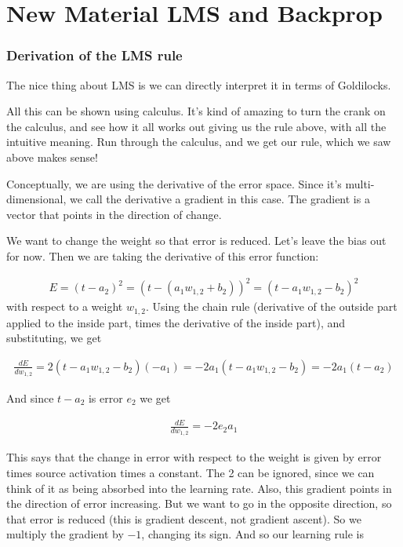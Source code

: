 \chapter{New Material LMS and Backprop}

\subsection{Derivation of the LMS rule}

The nice thing about LMS is we can directly interpret it in terms of Goldilocks.

All this can be shown using calculus. It's kind of amazing to turn the crank on the calculus, and see how it all works out giving us the rule above, with all the intuitive meaning. Run through the calculus, and we get our rule, which we saw above makes sense!

Conceptually, we are using the derivative of the error space. Since it's multi-dimensional, we call the derivative a gradient in this case. The gradient is a vector that points in the direction of change. 

We want to change the weight so that error is reduced. Let's leave the bias out for now. Then we are taking the  derivative of this error function:

\begin{eqnarray*}
E = (t - a_2)^2  =  (t - ( a_1 w_{1,2} + b_2))^2  =  (t -  a_1 w_{1,2} -  b_2)^2 
\end{eqnarray*}
with respect to a weight $w_{1,2}$.  Using the chain rule (derivative of the outside part applied to the inside part, times the derivative of the inside part), and substituting, we get

\begin{eqnarray*}
\frac{dE}{dw_{1,2}} = 2 (t - a_1 w_{1,2} - b_2) (-a_1) =  -2 a_1 (t - a_1 w_{1,2} - b_2) =  -2 a_1 (t - a_2)
\end{eqnarray*}

And since $t -  a_2$ is error $e_2$ we get

\begin{eqnarray*}
\frac{dE}{dw_{1,2}} = -2 e_2 a_1
\end{eqnarray*}

This says that the change in error with respect to the weight is given by error times source activation times a constant. The 2 can be ignored, since we can think of it as being absorbed into the learning rate. Also, this gradient points in the direction of error increasing. But we want to go in the opposite direction, so that error is reduced (this is gradient descent, not gradient ascent). So we multiply the gradient by $-1$, changing its sign. And so our learning rule is 


